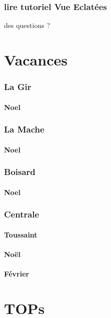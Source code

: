 		\subsubsection*{lire tutoriel Vue Eclatées} 
 \par des questions ?
\newpage 
 \section*{Vacances} 
 \par 
		\subsubsection*{La Gir} 
 \par 
			\paragraph{Noel} 
		\subsubsection*{La Mache} 
 \par 
			\paragraph{Noel} 
		\subsubsection*{Boisard} 
 \par 
			\paragraph{Noel} 
		\subsubsection*{Centrale} 
 \par 
			\paragraph{Toussaint} 
			\paragraph{Noël} 
			\paragraph{Février} 
\newpage 
 \section*{TOPs} 
 \par 
